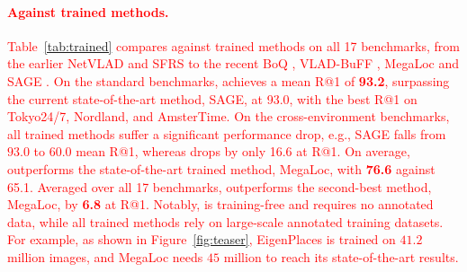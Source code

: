 \textcolor{red}{\paragraph{Against trained methods.} Table~\ref{tab:trained} compares \method{} against trained methods on all 17 benchmarks, from the earlier NetVLAD \citep{netvlad} and SFRS \citep{sfrs} to the recent BoQ \citep{boq}, VLAD-BuFF \citep{vladbuff}, MegaLoc \citep{megaloc} and SAGE \citep{sage}. On the standard benchmarks, \method{} achieves a mean R@1 of \textbf{93.2}, surpassing the current state-of-the-art method, SAGE, at 93.0, with the best R@1 on Tokyo24/7, Nordland, and AmsterTime. On the cross-environment benchmarks, all trained methods suffer a significant performance drop, e.g., SAGE falls from $93.0$ to $60.0$ mean R@1, whereas \method{} drops by only 16.6 at R@1. On average, \method{} outperforms the state-of-the-art trained method, MegaLoc, with \textbf{76.6} against 65.1. Averaged over all 17 benchmarks, \method{} outperforms the second-best method, MegaLoc, by \textbf{6.8} at R@1.
Notably, \method{} is training-free and requires no annotated data, while all trained methods rely on large-scale annotated training datasets. For example, as shown in Figure~\ref{fig:teaser}, EigenPlaces is trained on $41.2$ million images, and MegaLoc needs $45$ million to reach its state-of-the-art results.
}

